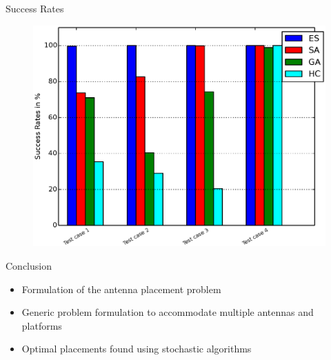 \documentclass{beamer}
\begin{document}
\begin{frame}{Success Rates}
    \begin{figure}
        \vspace*{-0.35cm}
        \centering
        \includegraphics[scale=0.48]{../paper/FIG/tc_sp}
    \end{figure}
\end{frame}

\begin{frame}{Conclusion}
    \begin{itemize}
        \item Formulation of the antenna placement problem
        \item Generic problem formulation to accommodate multiple antennas and platforms
        \item Optimal placements found using stochastic algorithms
    \end{itemize}
\end{frame}
\end{document}
